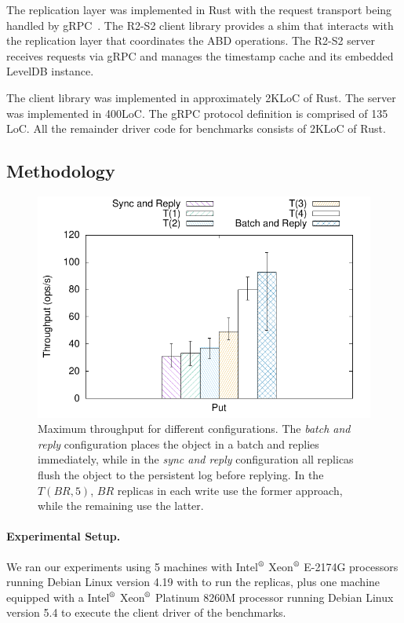 The replication layer was implemented in Rust with the request transport
being handled by gRPC~\cite{grpc}. The \ac{R2-S2} client library
provides a shim that interacts with the replication layer that
coordinates the \ac{ABD} operations. The \ac{R2-S2} server
receives requests via gRPC and manages the timestamp cache and
its embedded LevelDB instance.

The client library was implemented in approximately 2KLoC of
Rust. The server was implemented in 400LoC. The gRPC protocol
definition is comprised of 135 LoC. All the remainder driver code
for benchmarks consists of 2KLoC of Rust.

\subsection{Methodology}\label{ssec:r2s2methodology}

\begin{figure}[t]
    \centering
    \includegraphics[width=.75\linewidth]{r2s2_results/abd_small/tput.pdf}
    \caption{Maximum throughput for different configurations.
    The \emph{batch and reply} configuration places the
    object in a batch and replies immediately, while in the \emph{sync and reply} configuration all replicas
    flush the object to the persistent log before replying. In
    the $T(BR, 5)$, $BR$ replicas in each write use the former
    approach, while the remaining use the
    latter.}\label{fig:r2s2_asym}
\end{figure}
\paragraph{Experimental Setup.}
We ran our experiments using 5 machines  with
Intel$^\text{\textregistered}$ Xeon$^\text{\textregistered}$ E-2174G
processors running Debian Linux version 4.19 with  to run the replicas,
plus one machine equipped with a Intel$^\text{\textregistered}$
Xeon$^\text{\textregistered}$ Platinum 8260M processor running Debian
Linux version 5.4 to execute the client driver of the benchmarks.

